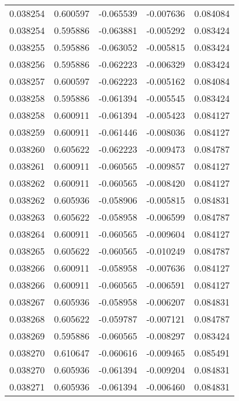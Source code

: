 \begin{tabular}{lrrrr}
0.038254    &  0.600597 & -0.065539 & -0.007636 &             0.084084 \\
0.038254    &  0.595886 & -0.063881 & -0.005292 &             0.083424 \\
0.038255    &  0.595886 & -0.063052 & -0.005815 &             0.083424 \\
0.038256    &  0.595886 & -0.062223 & -0.006329 &             0.083424 \\
0.038257    &  0.600597 & -0.062223 & -0.005162 &             0.084084 \\
0.038258    &  0.595886 & -0.061394 & -0.005545 &             0.083424 \\
0.038258    &  0.600911 & -0.061394 & -0.005423 &             0.084127 \\
0.038259    &  0.600911 & -0.061446 & -0.008036 &             0.084127 \\
0.038260    &  0.605622 & -0.062223 & -0.009473 &             0.084787 \\
0.038261    &  0.600911 & -0.060565 & -0.009857 &             0.084127 \\
0.038262    &  0.600911 & -0.060565 & -0.008420 &             0.084127 \\
0.038262    &  0.605936 & -0.058906 & -0.005815 &             0.084831 \\
0.038263    &  0.605622 & -0.058958 & -0.006599 &             0.084787 \\
0.038264    &  0.600911 & -0.060565 & -0.009604 &             0.084127 \\
0.038265    &  0.605622 & -0.060565 & -0.010249 &             0.084787 \\
0.038266    &  0.600911 & -0.058958 & -0.007636 &             0.084127 \\
0.038266    &  0.600911 & -0.060565 & -0.006591 &             0.084127 \\
0.038267    &  0.605936 & -0.058958 & -0.006207 &             0.084831 \\
0.038268    &  0.605622 & -0.059787 & -0.007121 &             0.084787 \\
0.038269    &  0.595886 & -0.060565 & -0.008297 &             0.083424 \\
0.038270    &  0.610647 & -0.060616 & -0.009465 &             0.085491 \\
0.038270    &  0.605936 & -0.061394 & -0.009204 &             0.084831 \\
0.038271    &  0.605936 & -0.061394 & -0.006460 &             0.084831 \\

\end{tabular}
